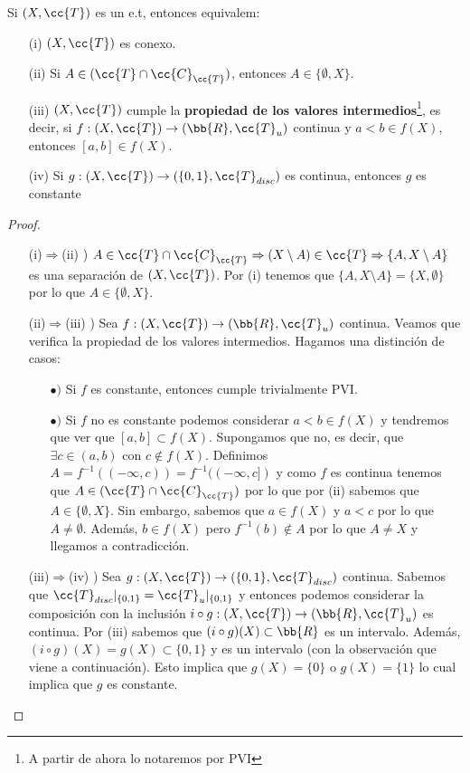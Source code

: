 \begin{teo}
    Si $(X, \cc{T})$ es un e.t, entonces equivalem:
    \begin{enumerate}
        \item[(i)] $(X, \cc{T})$ es conexo.
        \item[(ii)] Si $A\in (\cc{T}\cap \cc{C}_{\cc{T}})$, entonces $A\in\{\emptyset, X\}$.
        \item[(iii)] $(X, \cc{T})$ cumple la \textbf{propiedad de los valores intermedios}\footnote{A partir de ahora lo notaremos por PVI}, es decir, si $f:(X, \cc{T})\to (\bb{R}, \cc{T}_u)$ continua y $a<b\in f(X)$, entonces $[a,b]\in f(X)$.
        \item[(iv)] Si $g:(X, \cc{T})\to (\{0,1\}, \cc{T}_{disc})$ es continua, entonces $g$ es constante 
    \end{enumerate}
    \begin{proof}\
        \begin{itemize}
            \item[(i)$\Rightarrow$(ii) )] $A\in \cc{T}\cap \cc{C}_{\cc{T}} \Rightarrow (X\setminus A) \in \cc{T} \Rightarrow \{A, X\setminus A\}$ es una separación de $(X, \cc{T})$. Por (i) tenemos que $\{A, X\setminus A\}=\{X, \emptyset\}$ por lo que $A\in \{\emptyset, X\}$.
            \item[(ii)$\Rightarrow$(iii) )] Sea $f:(X, \cc{T})\to (\bb{R}, \cc{T}_u)$ continua. Veamos que verifica la propiedad de los valores intermedios. Hagamos una distinción de casos:
            \begin{itemize}
                \item[$\bullet)$] Si $f$ es constante, entonces cumple trivialmente PVI.
                \item[$\bullet)$] Si $f$ no es constante podemos considerar $a<b\in f(X)$ y tendremos que ver que $[a,b]\subset f(X)$. Supongamos que no, es decir, que $\exists c\in (a,b)$ con $c\notin f(X)$. Definimos $A=f^{-1}((-\infty, c)) = f^{-1}((-\infty, c])$ y como $f$ es continua tenemos que $A\in (\cc{T}\cap \cc{C}_{\cc{T}})$ por lo que por (ii) sabemos que $A\in \{\emptyset, X\}$. Sin embargo, sabemos que $a\in f(X)$ y $a<c$ por lo que $A\neq \emptyset$. Además, $b\in f(X)$ pero $f^{-1}(b)\notin A$ por lo que $A\neq X$ y llegamos a contradicción.
            \end{itemize}
            \item[(iii)$\Rightarrow $(iv) )] Sea $g:(X, \cc{T}) \to (\{0,1\}, \cc{T}_{disc})$ continua. Sabemos que $\cc{T}_{disc}|_{\{0,1\}} = \cc{T}_u|_{\{0,1\}}$ y entonces podemos considerar la composición con la inclusión $i\circ g:(X, \cc{T})\to (\bb{R}, \cc{T}_u)$ es continua. Por (iii) sabemos que $(i\circ g)(X)\subset \bb{R}$ es un intervalo. Además, $(i\circ g)(X) = g(X)\subset \{0,1\}$ y es un intervalo (con la observación que viene a continuación). Esto implica que $g(X)=\{0\}$ o $g(X)=\{1\}$ lo cual implica que $g$ es constante.

\end{itemize}
\end{proof}
\end{teo}
